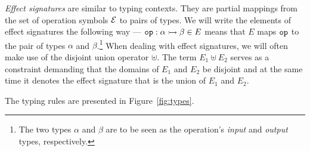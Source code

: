 \documentclass{llncs}
\begin{document}
\emph{Effect signatures} are similar to typing contexts. They are partial
mappings from the set of operation symbols $\mathcal{E}$ to pairs of types. We will
write the elements of effect signatures the following way ---
$\mathtt{op} : \alpha \rightarrowtail \beta \in E$ means that $E$ maps $\mathtt{op}$ to the
pair of types $\alpha$ and $\beta$.\footnote{The two types $\alpha$ and
  $\beta$ are to be seen as the operation's \emph{input} and \emph{output}
  types, respectively.} When dealing with effect signatures, we will often
make use of the disjoint union operator $\uplus$. The term $E_1 \uplus E_2$
serves as a constraint demanding that the domains of $E_1$ and $E_2$ be
disjoint and at the same time it denotes the effect signature that is the
union of $E_1$ and $E_2$.

The typing rules are presented in Figure~\ref{fig:types}.

\newcommand{\handlerrule}{
 \begin{prooftree}
  \AxiomC{$E = \{\typedopg{\op{op}_i}{\alpha_i}{\beta_i}\}_{i \in I} \uplus E_{\mathrm{f}}$}
  \noLine
  \def\extraVskip{0pt}
  \UnaryInfC{$E' = E'' \uplus E_{\mathrm{f}}$}
  \noLine
  \UnaryInfC{$[\Gamma \vdash M_i : \alpha_i \to (\beta_i \to
    \FF_{E'}(\delta)) \to \FF_{E'}(\delta)]_{i \in I}$}
  \noLine
  \UnaryInfC{$\Gamma \vdash M_\eta : \gamma \to \FF_{E'}(\delta)$}
  \noLine
  \UnaryInfC{$\Gamma \vdash N : \FF_{E}(\gamma)$}
  \def\extraVskip{2pt}
  \RightLabel{[$\banana{}$]}
  \UnaryInfC{$\Gamma \vdash \ap{\cibanana}{N} : \FF_{E'}(\delta)$}
 \end{prooftree}}
\end{document}
